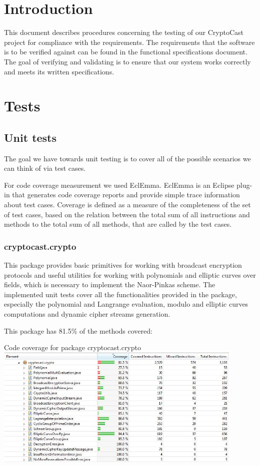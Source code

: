 \documentclass[a4paper,10pt]{scrartcl}
\title{\doctitle}
\author{\authorName}
\date{\today}
\begin{document}

\tableofcontents
\clearpage

\section{Introduction}
This document describes procedures concerning the testing of our CryptoCast project for compliance with the requirements. The requirements that the software is to be verified against can be found in the functional specifications document. The goal of verifying and validating is to ensure that our system works correctly and meets its written specifications.

\section{Tests}
\subsection{Unit tests}
The goal we have towards unit testing is to cover all of the possible scenarios we can think of via test cases.

For code coverage measurement we used EclEmma.
EclEmma is an Eclipse plug-in that generates code coverage reports and provide simple trace information about test cases. Coverage is defined as a measure of the completeness of the set of test cases, based on the relation between the total sum of all instructions and methods to the total sum of all methods, that are called by the test cases.

\subsubsection{cryptocast.crypto} This package provides basic primitives for working with broadcast encryption protocols and useful utilities for working with polynomials and elliptic curves over fields, which is necessary to implement the Naor-Pinkas scheme.
The implemented unit tests cover all the functionalities provided in the package, especially the polynomial and Langrange evaluation, modulo and elliptic curves computations and dynamic cipher streams generation.

This package has 81.5\% of the methods covered:
\begin{illustration}{Code coverage for package cryptocast.crypto}
\includegraphics[width=450px]{figures/images/crypto.jpg}
\end{illustration}
\end{document}
